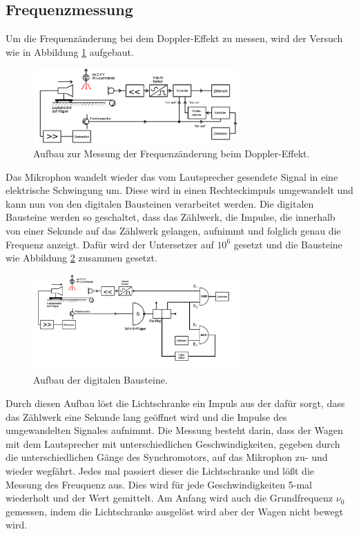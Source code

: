 \subsection{Frequenzmessung}
\label{sec:Frequenzmessung}
Um die Frequenzänderung bei dem Doppler-Effekt zu messen,
wird der Versuch wie in Abbildung \ref{abb:Frequenzdiff} aufgebaut.
\begin{figure}
\centering
\includegraphics[width=0.7\textwidth]{Frequenzmessung.PNG}
\caption{Aufbau zur Messung der Frequenzänderung beim Doppler-Effekt.\cite{skript}}
\label{abb:Frequenzdiff}
\end{figure} \FloatBarrier
Das Mikrophon wandelt wieder das vom Lautsprecher
gesendete Signal in eine elektrische Schwingung um.
Diese wird in einen Rechteckimpuls umgewandelt und
kann nun von den digitalen
Bausteinen verarbeitet werden.
Die digitalen Bausteine werden so geschaltet,
dass das Zählwerk, die Impulse, die innerhalb
von einer Sekunde auf das Zählwerk gelangen, aufnimmt und
folglich genau die Frequenz anzeigt.
Dafür wird der Untersetzer auf $10^6$ gesetzt
und die Bausteine wie Abbildung \ref{abb:digitalF} zusammen gesetzt.
\begin{figure}
\centering
\includegraphics[width=0.7\textwidth]{digitalebausteile.png}
\caption{Aufbau der digitalen Bausteine.}
\label{abb:digitalF}
\end{figure}
\FloatBarrier
Durch diesen Aufbau löst die Lichtschranke ein Impuls
aus der dafür sorgt, dass das Zählwerk eine Sekunde
lang geöffnet wird und die Impulse des umgewandelten
Signales aufnimmt.
Die Messung besteht darin, dass der Wagen mit
dem Lautsprecher mit unterschiedlichen Geschwindigkeiten,
gegeben durch die unterschiedlichen Gänge des Synchromotors,
auf das Mikrophon zu- und
wieder  wegfährt. Jedes mal passiert dieser
die Lichtschranke und lößt die Messung des
Freuquenz aus. Dies wird für jede Geschwindigkeiten
5-mal wiederholt und der Wert gemittelt. Am Anfang wird
auch die Grundfrequenz $\nu_{0}$ gemessen, indem die
Lichtschranke ausgelöst wird aber der Wagen nicht bewegt wird.
